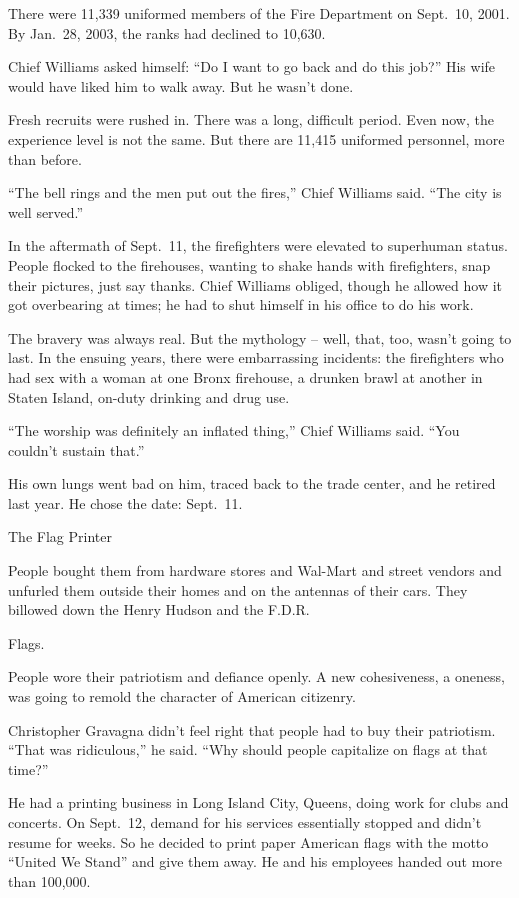 ﻿\documentclass[12pt]{article}
\begin{document}
There were 11,339 uniformed members of the Fire Department on Sept.~10, 2001. By Jan.~28, 2003, the
ranks had declined to 10,630.

Chief Williams asked himself: ``Do I want to go back and do this job?'' His wife would have liked
him to walk away. But he wasn't done.

Fresh recruits were rushed in. There was a long, difficult period. Even now, the experience level is
not the same. But there are 11,415 uniformed personnel, more than before.

``The bell rings and the men put out the fires,'' Chief Williams said. ``The city is well served.''

In the aftermath of Sept.~11, the firefighters were elevated to superhuman status. People flocked to
the firehouses, wanting to shake hands with firefighters, snap their pictures, just say thanks.
Chief Williams obliged, though he allowed how it got overbearing at times; he had to shut himself in
his office to do his work.

The bravery was always real. But the mythology -- well, that, too, wasn't going to last. In the
ensuing years, there were embarrassing incidents: the firefighters who had sex with a woman at one
Bronx firehouse, a drunken brawl at another in Staten Island, on-duty drinking and drug use.

``The worship was definitely an inflated thing,'' Chief Williams said. ``You couldn't sustain
that.''

His own lungs went bad on him, traced back to the trade center, and he retired last year. He chose
the date: Sept.~11.

The Flag Printer

People bought them from hardware stores and Wal-Mart and street vendors and unfurled them outside
their homes and on the antennas of their cars. They billowed down the Henry Hudson and the F.D.R.

Flags.

People wore their patriotism and defiance openly. A new cohesiveness, a oneness, was going to remold
the character of American citizenry.

Christopher Gravagna didn't feel right that people had to buy their patriotism. ``That was
ridiculous,'' he said. ``Why should people capitalize on flags at that time?''

He had a printing business in Long Island City, Queens, doing work for clubs and concerts. On
Sept.~12, demand for his services essentially stopped and didn't resume for weeks. So he decided to
print paper American flags with the motto ``United We Stand'' and give them away. He and his
employees handed out more than 100,000.
\end{document}
